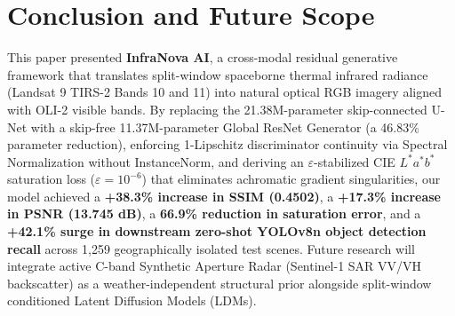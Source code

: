 \documentclass[10pt,a4paper,twoside]{article}
\begin{document}
\section{Conclusion and Future Scope}
This paper presented \textbf{InfraNova AI}, a cross-modal residual generative framework that translates split-window spaceborne thermal infrared radiance (Landsat 9 TIRS-2 Bands 10 and 11) into natural optical RGB imagery aligned with OLI-2 visible bands. By replacing the 21.38M-parameter skip-connected U-Net with a skip-free 11.37M-parameter Global ResNet Generator (a 46.83\% parameter reduction), enforcing 1-Lipschitz discriminator continuity via Spectral Normalization without InstanceNorm, and deriving an $\varepsilon$-stabilized CIE $L^*a^*b^*$ saturation loss ($\varepsilon = 10^{-6}$) that eliminates achromatic gradient singularities, our model achieved a \textbf{+38.3\% increase in SSIM (0.4502)}, a \textbf{+17.3\% increase in PSNR (13.745 dB)}, a \textbf{66.9\% reduction in saturation error}, and a \textbf{+42.1\% surge in downstream zero-shot YOLOv8n object detection recall} across 1,259 geographically isolated test scenes. Future research will integrate active C-band Synthetic Aperture Radar (Sentinel-1 SAR VV/VH backscatter) as a weather-independent structural prior alongside split-window conditioned Latent Diffusion Models (LDMs).
\end{document}
